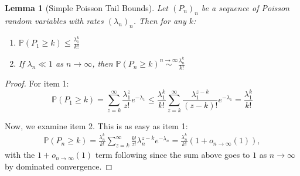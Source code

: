 \documentclass{article}
\numberwithin{equation}{section}
\newtheorem{lemma}{Lemma}
\begin{document}
\begin{lemma}[Simple Poisson Tail Bounds]\label{lem:poisson_tails}
  Let $(P_n)_n$ be a sequence of Poisson random variables with rates $(\lambda_n)_n$. Then for any $k$:
  \begin{enumerate}
    \item $\mathbb{P}(P_1\geq k)\leq \frac{\lambda_1^k}{k!}$
    \item If $\lambda_n\ll 1$ as $n\to\infty$, then $\mathbb{P}(P_n\geq k)\overset{n\to\infty}{\sim} \frac{\lambda_n^k}{k!}$
  \end{enumerate}
\end{lemma}
\begin{proof}
  For item 1:
  \[\mathbb{P}(P_1\geq k)= \sum_{z=k}^\infty \frac{\lambda_1^z}{z!}e^{-\lambda_1 }\leq \frac{\lambda_1^k}{k!}\sum_{z=k}^\infty \frac{\lambda_1^{z-k}}{(z-k)!}e^{-\lambda_1}=\frac{\lambda_1^k}{k!}\]

  Now, we examine item 2. This is as easy as item 1:
  \begin{align*}
    \mathbb{P}(P_n\geq k)=\frac{\lambda_n^k}{k!}\sum_{z=k}^\infty\frac{k!}{z!}\lambda_n^{z-k}e^{-\lambda_n}=\frac{\lambda_n^k}{k!}(1+o_{n\to\infty}(1)),
  \end{align*}
  with the $1+o_{n\to\infty}(1)$ term following since the sum above goes to $1$ as $n\to\infty$ by dominated convergence.
\end{proof}
\end{document}

